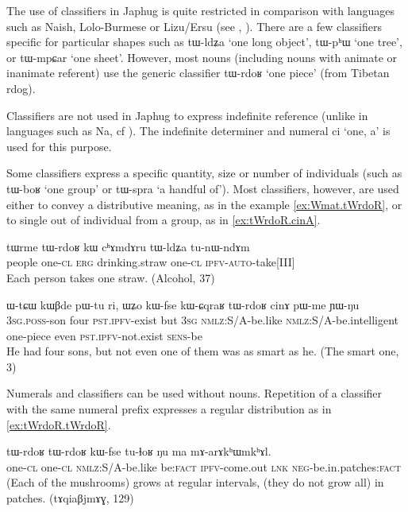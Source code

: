 \documentclass[oldfontcommands,oneside,a4paper,12pt]{article}
\newcommand{\ipa}[1]{{\phon#1}}
\begin{document}
The use of classifiers in Japhug is quite restricted in comparison with languages such as Naish, Lolo-Burmese or Lizu/Ersu (see \citealt[216-224]{lidz10na}, \citealt{zhang14classifiers}). There are a few classifiers specific for particular shapes such as \ipa{tɯ-ldʑa} `one long object', \ipa{tɯ-pʰɯ} `one tree', or \ipa{tɯ-mpɕar} `one sheet'. However, most nouns (including nouns with animate or inanimate referent) use the generic classifier \ipa{tɯ-rdoʁ} `one piece' (from Tibetan \ipa{rdog}).  

Classifiers are not used in Japhug to express indefinite reference (unlike in languages such as Na, cf \citealt[206]{lidz10na}). The indefinite determiner and numeral \ipa{ci} `one, a' is used for this purpose.

Some classifiers express a specific quantity,  size or number of individuals (such as \ipa{tɯ-boʁ} `one group' or \ipa{tɯ-spra} `a handful of'). Most classifiers, however, are used either to convey a distributive meaning, as in the example \ref{ex:Wmat.tWrdoR}, or to single out of individual from a group, as in \ref{ex:tWrdoR.cinA}.
 
\begin{exe}
\ex \label{ex:Wmat.tWrdoR}
\gll 
\ipa{tɯrme} 	\ipa{tɯ-rdoʁ} 	\ipa{kɯ} 	\ipa{cʰɤmdɤru} 	\ipa{tɯ-ldʑa} 	\ipa{tu-nɯ-ndɤm} \\
people one-\textsc{cl} \textsc{erg} drinking.straw one-\textsc{cl} \textsc{ipfv-auto}-take[III] \\
\glt Each person takes one straw. (Alcohol, 37)
\end{exe}
 
\begin{exe}
\ex \label{ex:tWrdoR.cinA}
\gll 
\ipa{ɯ-tɕɯ} 	\ipa{kɯβde} 	\ipa{pɯ-tu} 	\ipa{ri,} 	\ipa{ɯʑo} 	\ipa{kɯ-fse} 	\ipa{kɯ-ɕqraʁ} 	\ipa{tɯ-rdoʁ} 	\ipa{cinɤ} 	\ipa{pɯ-me} 	\ipa{ɲɯ-ŋu} 	\\
\textsc{3sg.poss}-son four \textsc{pst.ipfv}-exist but \textsc{3sg} \textsc{nmlz}:S/A-be.like \textsc{nmlz}:S/A-be.intelligent one-piece even \textsc{pst.ipfv}-not.exist \textsc{sens}-be \\
\glt He had four sons, but not even one of them was as smart as he. (The smart one, 3)
\end{exe} 
 
 Numerals and classifiers can be used without nouns. Repetition of a classifier with the same numeral prefix  expresses a regular distribution as in \ref{ex:tWrdoR.tWrdoR}.
 
 \begin{exe}
\ex \label{ex:tWrdoR.tWrdoR}
\gll 
 \ipa{tɯ-rdoʁ} 	\ipa{tɯ-rdoʁ} 	\ipa{kɯ-fse} 	\ipa{tu-ɬoʁ} 	\ipa{ŋu} 	\ipa{ma} 	\ipa{mɤ-arɤkʰɯmkʰɤl.}  \\
  one-\textsc{cl}  one-\textsc{cl} \textsc{nmlz}:S/A-be.like  be:\textsc{fact} \textsc{ipfv}-come.out \textsc{lnk} \textsc{neg}-be.in.patches:\textsc{fact} \\
 \glt (Each of the mushrooms) grows at regular intervals, (they do not grow all) in patches. (\ipa{tɤqiaβjmɤɣ}, 129)
\end{exe}
 
\end{document}
